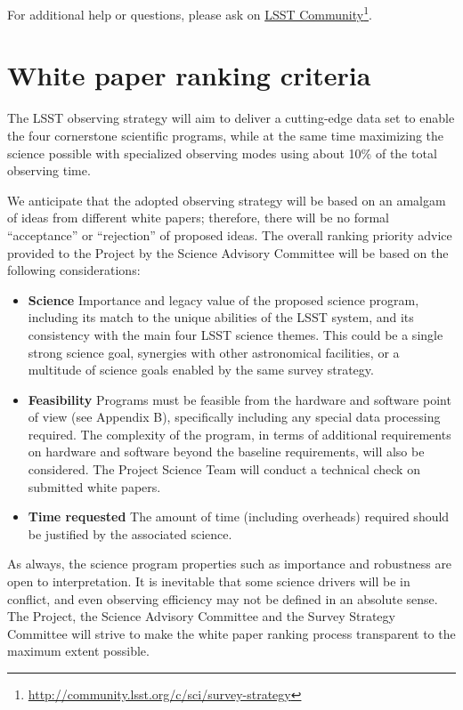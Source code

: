 \documentclass[DM,lsstdraft,toc,usenatbib]{lsstdoc}
\begin{document}
For additional help or questions, please ask on \href{https://community.lsst.org/c/sci}{LSST Community}\footnote{\url{http://community.lsst.org/c/sci/survey-strategy}}. 


\section{White paper ranking criteria \label{sec:ranking}} 

The LSST observing strategy will aim to deliver a cutting-edge data set to enable
the four cornerstone scientific programs, while at the same time maximizing the 
science possible with specialized observing modes using about 10\% of the total observing time. 

We anticipate that the adopted observing strategy will be based on an amalgam of ideas from 
different white papers; therefore, there will be no formal ``acceptance'' or ``rejection'' of
proposed ideas. The overall ranking priority advice provided to the Project by the Science Advisory Committee 
will be based on the following considerations: 
\begin{itemize}
\item {\bf Science} Importance and legacy value of the proposed science program, including 
           its match to the unique abilities of the LSST system, and its consistency with the 
           main four LSST science themes. This could be a single strong science goal, synergies with
           other astronomical facilities, or a multitude of science goals enabled by the same survey strategy. 
\item {\bf Feasibility} Programs must be feasible from the hardware and software point of view (see Appendix B),
         specifically including any special data processing required. The complexity of the program, in terms of additional
         requirements on hardware and software beyond the baseline requirements, will also be considered. 
         The Project Science Team will conduct a technical check on submitted white papers.
\item {\bf Time requested} The amount of time (including overheads) required should be justified by 
        the associated science. 
\end{itemize} 

As always, the science program properties such as importance and robustness are open
to interpretation. It is inevitable that some science drivers will be in conflict, and even
observing efficiency may not be defined in an absolute sense. The Project, the Science Advisory 
Committee and the Survey Strategy Committee will strive to make the white paper ranking process 
transparent to the maximum extent possible. 
\end{document}
